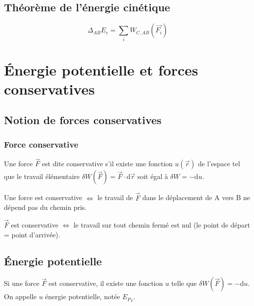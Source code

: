 \documentclass[french]{yLectureNote}
\newcommand{\Lim}[1]{\lim\limits_{\substack{#1}}\:}
\renewcommand{\vec}{\overrightarrow}
\newcommand{\dd}[0]{\mathrm{d}}
\begin{document}
\subsection{Théorème de l'énergie cinétique}
\begin{theorem}[Énoncé]
\[\Delta_{AB} E_c = \sum_i W_{C,AB}(\vec{F_i})\]
\end{theorem}
\section{Énergie potentielle et forces conservatives}
\subsection{Notion de forces conservatives}
%
%
%
\subsubsection{Force conservative}
\begin{definition}[Définition 1]
Une force $\vec{F}$ est dite conservative s'il existe une fonction $u(\vec{r})$ de l'espace tel que le travail élémentaire $\delta W(\vec{F}) = \vec{F}\cdot \dd \vec{r}$ soit égal à $\delta W = -\dd u$.
\end{definition}
\begin{definition}[Définition 2]
Une force est conservative $\iff$ le travail de $\vec{F}$ dans le déplacement de A vers B ne dépend pas du chemin pris.
\end{definition}
\begin{definition}[Définition 3]
$\vec{F}$ est conservative $\iff$ le travail sur tout chemin fermé est nul (le point de départ = point d'arrivée).
\end{definition}
\subsection{Énergie potentielle}
\begin{definition}
Si une force $\vec{F}$ est conservative, il existe une fonction $u$ telle que $\delta W(\vec{F}) = -\dd u$. On appelle $u$ énergie potentielle, notée $E_{P_F}$.
\end{definition}
\end{document}
